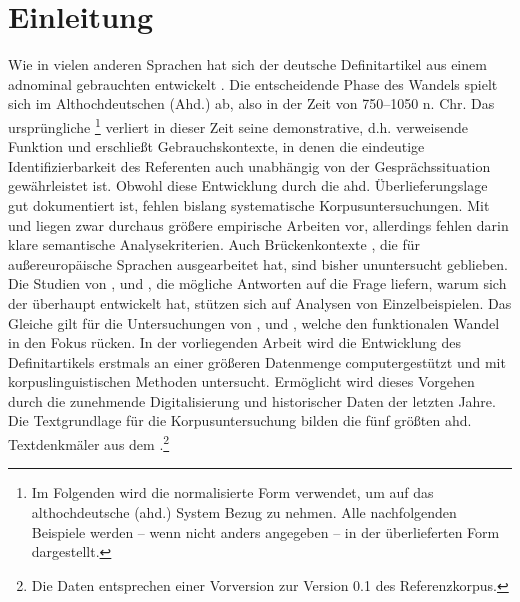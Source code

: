 \chapter{Einleitung}

Wie in vielen anderen Sprachen hat sich der deutsche Definitartikel aus einem adnominal gebrauchten  entwickelt  \parencite{Oubouzar1992,Szczepaniak2011a}. Die entscheidende Phase des Wandels spielt sich im Althochdeutschen (Ahd.) ab, also in der Zeit von 750--1050 n. Chr. Das ursprüngliche   \footnote{Im Folgenden wird die normalisierte Form  verwendet, um auf das althochdeutsche (ahd.) System Bezug zu nehmen. Alle nachfolgenden Beispiele werden -- wenn nicht anders angegeben -- in der überlieferten Form dargestellt.} verliert in dieser Zeit seine demonstrative, d.h. verweisende Funktion und erschließt Gebrauchskontexte, in denen die eindeutige Identifizierbarkeit des Referenten auch unabhängig von der Gesprächssituation gewährleistet ist. Obwohl diese Entwicklung durch die ahd. Überlieferungslage gut dokumentiert ist, fehlen bislang systematische Korpusuntersuchungen.  Mit \textcite{Hodler1954} und \textcite{Oubouzar1989,Oubouzar1992,Oubouzar1997a} liegen zwar durchaus größere empirische Arbeiten vor, allerdings fehlen darin klare semantische Analysekriterien. Auch Brückenkontexte  \parencite{Heine2002a}, die \textcite{Himmelmann1997} für außereuropäische Sprachen ausgearbeitet hat, sind bisher ununtersucht geblieben. Die Studien von \textcite{Abraham1997}, \textcite{Philippi1997} und \textcite{Leiss2000}, die mögliche Antworten auf die Frage liefern, warum sich der  überhaupt entwickelt hat, stützen sich auf Analysen von Einzelbeispielen. Das Gleiche gilt für die Untersuchungen von \textcite{Demske2001}, \textcite{Kraiss2012,Kraiss2014} und \textcite{Schlachter2015}, welche den funktionalen Wandel in den Fokus rücken.
In der vorliegenden Arbeit wird die Entwicklung des Definitartikels  erstmals an einer größeren Datenmenge computergestützt und mit korpuslinguistischen Methoden  untersucht. Ermöglicht wird dieses Vorgehen durch die zunehmende Digitalisierung und  historischer Daten der letzten Jahre. Die Textgrundlage für die Korpusuntersuchung  bilden die fünf größten ahd. Textdenkmäler aus dem   \parencite{Donhauser2014}.\footnote{Die Daten entsprechen einer Vorversion zur Version 0.1 des Referenzkorpus.}

